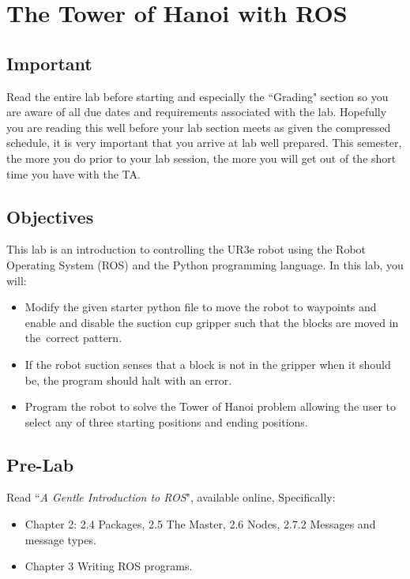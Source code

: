 \chapter{The Tower of Hanoi with ROS}
\section{Important}
Read the entire lab before starting and especially the ``Grading" section so you are aware of all due dates and requirements associated with the lab.  Hopefully you are reading this well before your lab section meets as given the compressed schedule, it is very important that you arrive at lab well prepared.  This semester, the more you do prior to your lab session, the more you will get out of the short time you have with the TA.
\section{Objectives}
This lab is an introduction to controlling the UR3e robot using the Robot Operating System (ROS) and the Python programming language.  In this lab, you will:
\begin{itemize}
\item Modify the given starter python file to move the robot to waypoints and enable and disable the suction cup gripper such that the blocks are moved in the\
correct pattern.
\item If the robot suction senses that a block is not in the gripper when it should be, the program should halt with an error.
\item Program the robot to solve the Tower of Hanoi problem allowing the user to select any of three starting positions and ending positions.
\end{itemize}

\newpage
\section{Pre-Lab}
Read ``\textit{A Gentle Introduction to ROS}", available online, Specifically:
\begin{itemize}
\item Chapter 2: 2.4 Packages, 2.5 The Master, 2.6 Nodes, 2.7.2 Messages and message types.
\item Chapter 3 Writing ROS programs.
\end{itemize}
